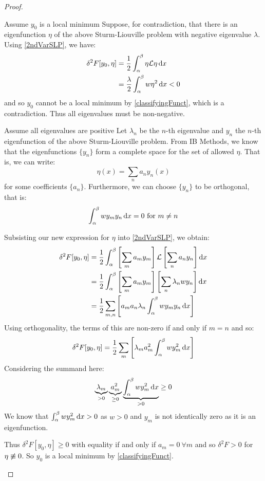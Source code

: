\documentclass[../main.tex]{subfiles}
\begin{document}
\begin{proof}
  \begin{proofdirection}{Assume $y_0$ is a local minimum}
    Suppose, for contradiction, that there is an eigenfunction $\eta$ of the above Sturm-Liouville problem with negative eigenvalue $\lambda$.
    Using \cref{2ndVarSLP}, we have:
    \begin{align*}
      \delta^2 F[y_0, \eta] &= \frac{1}{2} \int_{\alpha}^{\beta} \eta \mathcal{L} \eta \d{x} \\ \
                            &= \frac{\lambda}{2} \int_{\alpha}^{\beta} w \eta^2 \d{x} < 0
    \end{align*}
    and so $y_0$ cannot be a local minimum by \cref{classifyingFunct}, which is a contradiction.
    Thus all eigenvalues must be non-negative.
  \end{proofdirection}
  \begin{proofdirection}{Assume all eigenvalues are positive}
    Let $\lambda_n$ be the $n$-th eigenvalue and $y_n$ the $n$-th eigenfunction of the above Sturm-Liouville problem.
    From IB Methods, we know that the eigenfunctions $\{y_n\}$ form a complete space for the set of allowed $\eta$.
    That is, we can write:
    \[
      \eta(x) = \sum_{n} a_n y_n(x)
    \]
    for some coefficients $\{a_n\}$.
    Furthermore, we can choose $\{y_n\}$ to be orthogonal, that is:
    \[
      \int_{\alpha}^{\beta} w y_m y_n \d{x} = 0 \text{ for } m \neq n
    \]

    Subsisting our new expression for $\eta$ into \cref{2ndVarSLP}, we obtain:
    \begin{align*}
      \delta^2 F[y_0, \eta] &= \frac{1}{2} \int_{\alpha}^{\beta} \left[\sum_{m} a_m y_m\right] \mathcal{L} \left[\sum_{n} a_n y_n\right] \d{x} \\
                            &= \frac{1}{2} \int_{\alpha}^{\beta} \left[\sum_{m} a_m y_m\right] \left[\sum_{n} \lambda_n w y_n\right] \d{x} \\
                            &= \frac{1}{2} \sum_{m, n} \left[a_m a_n \lambda_n \int_{\alpha}^{\beta} w y_m y_n \d{x}\right]
    \end{align*}
    Using orthogonality, the terms of this are non-zero if and only if $m = n$ and so:
    \[
      \delta^2 F[y_0, \eta] = \frac{1}{2} \sum_{m} \left[\lambda_m a^2_m \int_{\alpha}^{\beta} w y^2_m \d{x}\right]
    \]
    Considering the summand here:
    \[
      \underbrace{\lambda_m}_{> 0} \underbrace{a^2_m}_{\geq 0} \underbrace{\int_{\alpha}^{\beta} w y^2_m \d{x}}_{> 0} \geq 0
    \]
    We know that $\int_{\alpha}^{\beta} w y^2_m \d{x} > 0$ as $w > 0$ and $y_m$ is not identically zero as it is an eigenfunction.

    Thus $\delta^2 F[y_0, \eta] \geq 0$ with equality if and only if $a_m = 0\ \forall m$ and so $\delta^2 F > 0$ for $\eta \centernot\equiv 0$.
    So $y_0$ is a local minimum by \cref{classifyingFunct}.
  \end{proofdirection}
\end{proof}
\end{document}
